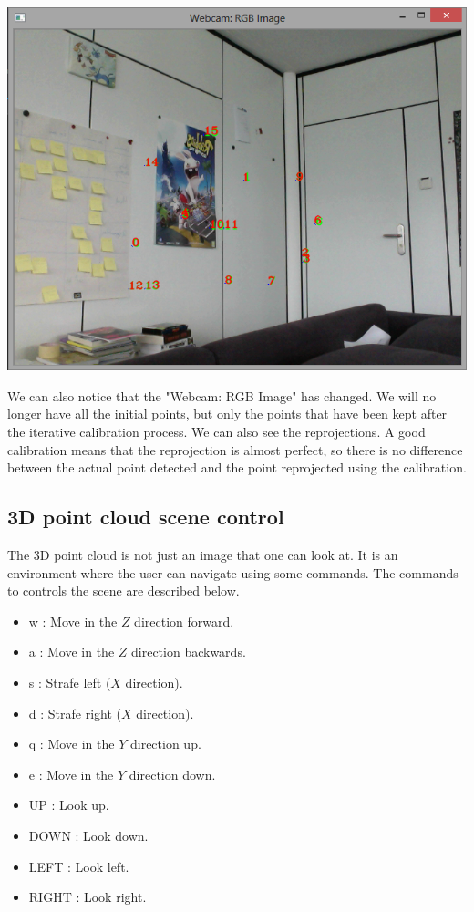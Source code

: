 \begin{center}
	\includegraphics[scale=0.7]{images/depth_reconstruction_2.png}
\end{center}

\noindent
We can also notice that the "Webcam: RGB Image" has changed. We will no longer have all the initial points, but only the points that have been kept after the iterative calibration process. We can also see the reprojections. A good calibration means that the reprojection is almost perfect, so there is no difference between the actual point detected and the point reprojected using the calibration. 

\subsection{3D point cloud scene control}
\noindent
The 3D point cloud is not just an image that one can look at. It is an environment where the user can navigate using some commands. The commands to controls the scene are described below.

\begin{itemize}
	\item w : Move in the $Z$ direction forward.
	\item a : Move in the $Z$ direction backwards.
	\item s : Strafe left ($X$ direction).
	\item d : Strafe right ($X$ direction).
	\item q : Move in the $Y$ direction up.
	\item e : Move in the $Y$ direction down.
	\item UP : Look up.
	\item DOWN : Look down.
	\item LEFT : Look left.
	\item RIGHT : Look right. 
\end{itemize}

